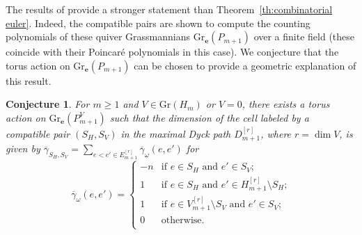 \documentclass{amsart}
\newtheorem{conjecture}[theorem]{Conjecture}
\numberwithin{equation}{section}
\newcommand{\bfe}{\mathbf{e}}
\newcommand{\Gr}{\mathrm{Gr}}
\begin{document}
The results of \cite{rupel} provide a stronger statement than Theorem~\ref{th:combinatorial euler}.
Indeed, the compatible pairs are shown to compute the counting polynomials of these quiver Grassmannians $\Gr_\bfe(P_{m+1})$ over a finite field (these coincide with their Poincar\'e polynomials in this case).  
We conjecture that the torus action on $\Gr_\bfe(P_{m+1})$ can be chosen to provide a geometric explanation of this result.
\begin{conjecture}
  \label{conj:cell dimensions}
  For $m\ge1$ and $V\in\Gr(H_m)$ or $V=0$, there exists a torus action on $\Gr_\bfe(P_{m+1}^V)$ such that the dimension of the cell labeled by a compatible pair $(S_H,S_V)$ in the maximal Dyck path $D_{m+1}^{[r]}$, where $r=\dim V$, is given by $\overline{\gamma}_{S_H,S_V}=\sum\limits_{e<e'\in E_{m+1}^{[r]}}\overline{\gamma}_\omega(e,e')$ for
  \begin{equation*}
    \overline{\gamma}_\omega(e,e')=\begin{cases}
      -n & \text{if $e\in S_H$ and $e'\in S_V$;}\\ 
      1 & \text{if $e\in S_H$ and $e'\in H_{m+1}^{[r]}\setminus S_H$;}\\ 
      1 & \text{if $e\in V_{m+1}^{[r]}\setminus S_V$ and $e'\in S_V$;}\\ 
      0 & \text{otherwise.}\\ 
    \end{cases}
  \end{equation*}
\end{conjecture}
\end{document}

